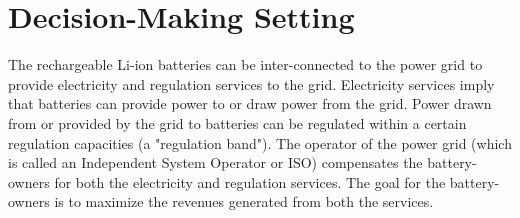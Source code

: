 \documentclass[11pt,twoside]{article}
\begin{document}
\section{Decision-Making Setting}\label{sec:setting}
The rechargeable Li-ion batteries can be inter-connected to the power grid to provide electricity and regulation services to the grid. Electricity services imply that batteries can provide power to or draw power from the grid. Power drawn from or provided by the grid to batteries can be regulated within a certain regulation capacities (a "regulation band"). The operator of the power grid (which is called an Independent System Operator or ISO) compensates the battery-owners for both the electricity and regulation services. The goal for the battery-owners is to maximize the revenues generated from both the services.
\end{document}
